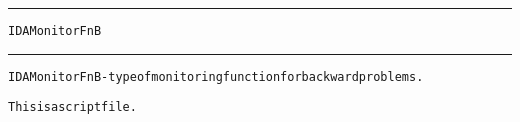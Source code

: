 \begin{samepage}
\hrule
\begin{center}
{\large \verb!IDAMonitorFnB!}
\label{p:IDAMonitorFnB}
\end{center}
\hrule\vspace{0.1in}



\begin{alltt}
IDAMonitorFnB - type of monitoring function for backward problems.
\end{alltt}

\end{samepage}



\begin{samepage}


\begin{alltt}
This is a script file. 
\end{alltt}

\end{samepage}



